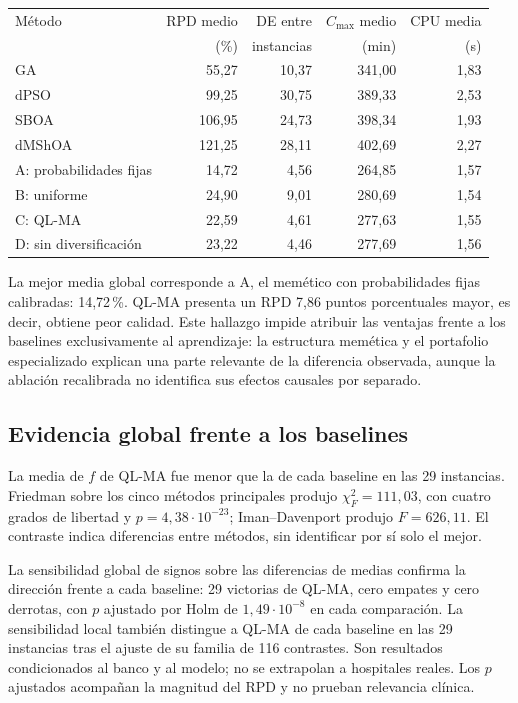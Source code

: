 \documentclass[11pt,a4paper]{article}
\newcommand{\Cmax}{C_{\max}}
\begin{document}
\begin{center}\small
\begin{tabularx}{\linewidth}{@{}Yrrrr@{}}\toprule
Método & RPD medio & DE entre & $\Cmax$ medio & CPU media\\
 & (\%) & instancias & (min) & (s)\\\midrule
GA & 55,27 & 10,37 & 341,00 & 1,83 \\
dPSO & 99,25 & 30,75 & 389,33 & 2,53 \\
SBOA & 106,95 & 24,73 & 398,34 & 1,93 \\
dMShOA & 121,25 & 28,11 & 402,69 & 2,27 \\
A: probabilidades fijas & 14,72 & 4,56 & 264,85 & 1,57 \\
B: uniforme & 24,90 & 9,01 & 280,69 & 1,54 \\
C: QL-MA & 22,59 & 4,61 & 277,63 & 1,55 \\
D: sin diversificación & 23,22 & 4,46 & 277,69 & 1,56 \\
\bottomrule
\end{tabularx}
\label{tab:resultados}
\end{center}

La mejor media global corresponde a A, el memético con probabilidades fijas calibradas: 14,72\,\%. QL-MA presenta un RPD 7,86 puntos porcentuales mayor, es decir, obtiene peor calidad. Este hallazgo impide atribuir las ventajas frente a los baselines exclusivamente al aprendizaje: la estructura memética y el portafolio especializado explican una parte relevante de la diferencia observada, aunque la ablación recalibrada no identifica sus efectos causales por separado.

\subsection{Evidencia global frente a los baselines}
La media de $f$ de QL-MA fue menor que la de cada baseline en las 29 instancias. Friedman sobre los cinco métodos principales produjo $\chi_F^2=111,03$, con cuatro grados de libertad y $p=4,38\cdot10^{-23}$; Iman--Davenport produjo $F=626,11$. El contraste indica diferencias entre métodos, sin identificar por sí solo el mejor.

La sensibilidad global de signos sobre las diferencias de medias confirma la dirección frente a cada baseline: 29 victorias de QL-MA, cero empates y cero derrotas, con $p$ ajustado por Holm de $1,49\cdot10^{-8}$ en cada comparación. La sensibilidad local también distingue a QL-MA de cada baseline en las 29 instancias tras el ajuste de su familia de 116 contrastes. Son resultados condicionados al banco y al modelo; no se extrapolan a hospitales reales. Los $p$ ajustados acompañan la magnitud del RPD y no prueban relevancia clínica.
\end{document}
